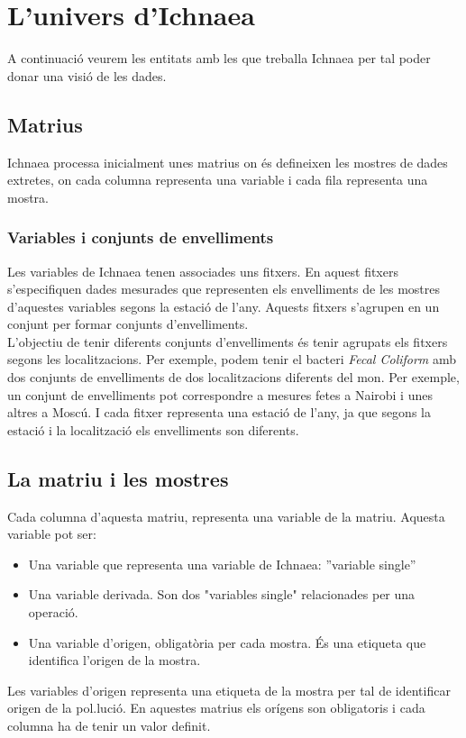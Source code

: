 \section{L'univers d'Ichnaea}
A continuaci\'{o} veurem les entitats amb les que treballa Ichnaea per tal poder donar una visi\'{o} de les dades.

\subsection{Matrius}
\label{cha:backgroud:univers:matrius}
Ichnaea processa inicialment unes matrius on \'e{s} defineixen les mostres de dades extretes, on cada columna representa una variable i cada fila representa una mostra. 

\subsubsection{Variables i conjunts de envelliments}
\label{cha:backgroud:univers:matrius:variables_seasons}
Les variables de Ichnaea tenen associades uns fitxers. En aquest fitxers s'especifiquen dades mesurades que representen els envelliments de les mostres d'aquestes variables segons la estació de l'any. Aquests fitxers s'agrupen en un conjunt per formar conjunts d'envelliments.\\

L'objectiu de tenir diferents conjunts d'envelliments \'{e}s tenir agrupats els fitxers segons les localitzacions. Per exemple, podem tenir el bacteri \textit{Fecal Coliform} amb dos conjunts de envelliments de dos localitzacions diferents del mon. Per exemple, un conjunt de envelliments pot correspondre a mesures fetes a Nairobi i unes altres a Mosc\'{u}. I cada fitxer representa una estaci\'{o} de l'any, ja que segons la estaci\'{o} i la localitzaci\'{o} els envelliments son diferents.\\

\subsection{La matriu i les mostres}
Cada columna d'aquesta matriu, representa una variable de la matriu. Aquesta variable pot ser:\\
\begin{itemize}
\item Una variable que representa una variable de Ichnaea: ''variable single''
\item Una variable derivada. Son dos "variables single" relacionades per una operaci\'{o}.
\item Una variable d'origen, obligatòria per cada mostra. \'{E}s una etiqueta que identifica l'origen de la mostra.
\end{itemize}
Les variables d'origen representa una etiqueta de la mostra per tal de identificar origen de la pol.luci\'{o}. En aquestes matrius els orígens son obligatoris i cada columna ha de tenir un valor definit.\\

